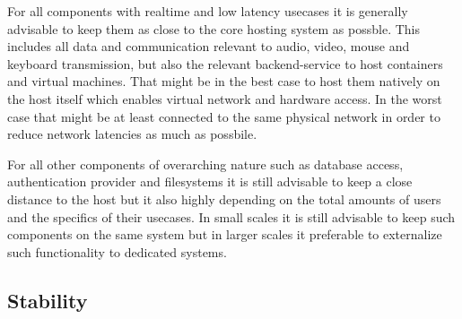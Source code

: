 \documentclass[runningheads]{llncs}
\begin{document}
For all components with realtime and low latency usecases it is generally advisable
to keep them as close to the core hosting system as possble.
This includes all data and communication
relevant to audio, video, mouse and keyboard transmission,
but also the relevant backend-service to host containers and virtual machines.
That might be in the best case to host them natively on the host itself
which enables virtual network and hardware access.
In the worst case that might be at least connected to the same physical network
in order to reduce network latencies as much as possbile.

For all other components of overarching nature
such as database access, authentication provider and filesystems
it is still advisable to keep a close distance to the host
but it also highly depending on the total amounts of users
and the specifics of their usecases.
In small scales it is still advisable to keep such components on the same system
but in larger scales it preferable to externalize such functionality to dedicated systems.


\subsection{Stability}
%
\end{document}
